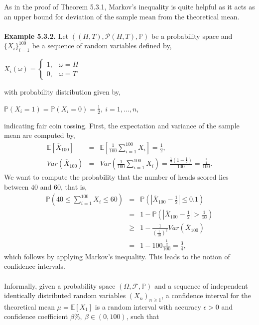 \documentclass{article}
\begin{document}
As in the proof of Theorem 5.3.1, Markov's inequality is quite helpful as it acts as an upper bound for deviation of the sample mean from the theoretical mean.\\\\
\textbf{Example 5.3.2.} Let $((H,T),\mathcal{P}(H,T),\mathbb{P})$ be a probability space and $\{X_i\}_{i=1}^{100}$ be a sequence of random variables defined by,
\begin{center}
	$X_i(\omega) = 
	\begin{cases}
	1, & \omega = H\\
	0, & \omega = T
	\end{cases}$
\end{center}
with probability distribution given by,
\begin{center}
	$\mathbb{P}(X_i = 1) = \mathbb{P}(X_i = 0) = \frac{1}{2}, \ i = 1,...,n$,
\end{center}
indicating fair coin tossing. First, the expectation and variance of the sample mean are computed by,
\begin{eqnarray}
\nonumber
\mathbb{E}[\overline{X}_{100}] &=& \mathbb{E}\left[\frac{1}{100}\sum_{i=1}^{100}X_i\right]= \frac{1}{2},\\
\nonumber
Var(\overline{X}_{100}) &=& Var\left(\frac{1}{100}\sum_{i=1}^{100}X_i\right) = \frac{\frac{1}{2}(1-\frac{1}{2})}{100} = \frac{\frac{1}{4}}{100}.
\end{eqnarray}
We want to compute the probability that the number of heads scored lies between $40$ and $60$, that is,
\begin{eqnarray}
\nonumber
\mathbb{P}\left(40 \leq \sum_{i=1}^{100}X_i \leq 60\right) &=& \mathbb{P}\left(\left|\overline{X}_{100} - \frac{1}{2}\right| \leq 0.1\right)\\
\nonumber
&=& 1 - \mathbb{P}\left(\left|\overline{X}_{100} - \frac{1}{2}\right| > \frac{1}{10}\right)\\
\nonumber
&\geq& 1 - \frac{1}{(\frac{1}{10})^2}Var(\overline{X}_{100}) \\
\nonumber
&=& 1 - 100\frac{\frac{1}{4}}{100} = \frac{3}{4},
\end{eqnarray}
which follows by applying Markov's inequality. This leads to the notion of confidence intervals.\\\\
Informally, given a probability space $(\Omega,\mathcal{F},\mathbb{P})$ and a sequence of independent identically distributed random variables $(X_n)_{n\geq1}$, a confidence interval for the theoretical mean $\mu = \mathbb{E}[X_1]$ is a random interval with accuracy $\epsilon > 0$ and confidence coefficient $\beta\%, \ \beta \in (0,100)$, such that
\end{document}
